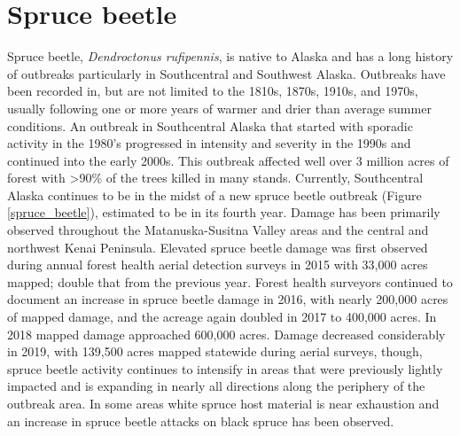 \section{Spruce beetle}
Spruce beetle, \textit{Dendroctonus rufipennis}, is native to Alaska and has a long history of outbreaks particularly in Southcentral and Southwest Alaska. Outbreaks have been recorded in, but are not limited to the 1810s, 1870s, 1910s, and 1970s, usually following one or more years of warmer and drier than average summer conditions. An outbreak in Southcentral Alaska that started with sporadic activity in the 1980’s progressed in intensity and severity in the 1990s and continued into the early 2000s. This outbreak affected well over 3 million acres of forest with >90\% of the trees killed in many stands. Currently, Southcentral Alaska continues to be in the midst of a new spruce beetle outbreak (Figure \ref{spruce_beetle}), estimated to be in its fourth year. Damage has been primarily observed throughout the Matanuska-Susitna Valley areas and the central and northwest Kenai Peninsula. Elevated spruce beetle damage was first observed during annual forest health aerial detection surveys in 2015 with 33,000 acres mapped; double that from the previous year. Forest health surveyors continued to document an increase in spruce beetle damage in 2016, with nearly 200,000 acres of mapped damage, and the acreage again doubled in 2017 to 400,000 acres. In 2018 mapped damage approached 600,000 acres. Damage decreased considerably in 2019, with 139,500 acres mapped statewide during aerial surveys, though, spruce beetle activity continues to intensify in areas that were previously lightly impacted and is expanding in nearly all directions along the periphery of the outbreak area.  In some areas white spruce host material is near exhaustion and an increase in spruce beetle attacks on black spruce has been observed.

